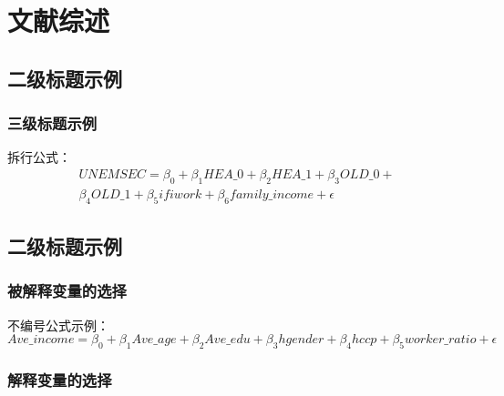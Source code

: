\chapter{文献综述}
\section{二级标题示例}
\subsection{三级标题示例}
拆行公式：
\begin{equation}
    \begin{split}
        UNEMSEC = \beta_0 + \beta_1HEA\_0 + \beta_2HEA\_1 + \beta_3OLD\_0 + \\
        \beta_4OLD\_1 + \beta_5ifiwork + \beta_6family\_income + \epsilon
    \end{split}
\end{equation}

\section{二级标题示例}

\subsection{被解释变量的选择}

不编号公式示例：
\[Ave\_income = \beta_0 + \beta_{1}Ave\_age + \beta_{2}Ave\_edu + \beta_{3}hgender + \beta_{4}hccp + \beta_{5}worker\_ratio + \epsilon\]


\subsection{解释变量的选择}

